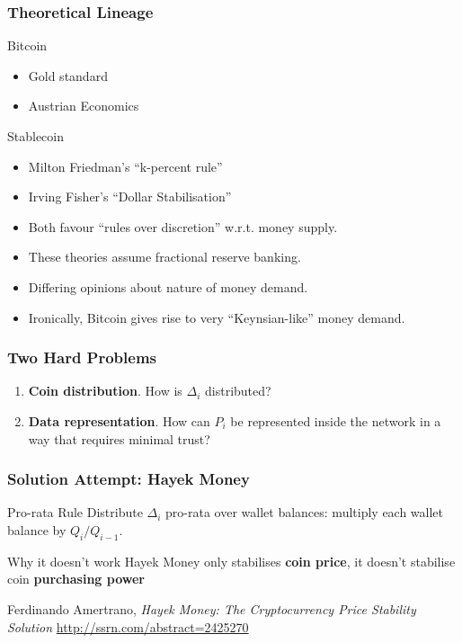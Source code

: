 \documentclass{beamer}
\begin{document}
\begin{frame}
  \frametitle{Theoretical Lineage}

  \begin{block}{Bitcoin}
    \begin{itemize}
    \item Gold standard
    \item Austrian Economics  
    \end{itemize}
  \end{block}

  \begin{block}{Stablecoin}
    \begin{itemize}
    \item Milton Friedman's ``k-percent rule''
    \item Irving Fisher's ``Dollar Stabilisation''
    \end{itemize}
  \end{block}

  \begin{itemize}
  \item Both favour ``rules over discretion'' w.r.t. money
    supply.
  \item These theories assume fractional reserve banking.
  \item Differing opinions about nature of money demand.
  \item Ironically, Bitcoin gives rise to very ``Keynsian-like'' money
    demand.
  \end{itemize}
  
\end{frame}

\begin{frame}
  \frametitle{Two Hard Problems}
  \begin{enumerate}
  \item \textbf{Coin distribution}. How is $\Delta_{i}$ distributed?
  \item \textbf{Data representation}. How can $P_{i}$ be represented
    inside the network in a way that requires minimal trust?
  \end{enumerate}
\end{frame}

\begin{frame}
  \frametitle{Solution Attempt: Hayek Money}
  
  \begin{block}{Pro-rata Rule}
    Distribute $\Delta_{i}$ pro-rata over wallet balances: multiply
    each wallet balance by $Q_{i}/Q_{i-1}$.
  \end{block}
  
  \begin{block}{Why it doesn't work}
    Hayek Money only stabilises \textbf{coin price}, it doesn't stabilise
    coin \textbf{purchasing power}
  \end{block}

  Ferdinando Amertrano, \emph{Hayek Money: The Cryptocurrency Price
    Stability Solution} 
  \url{http://ssrn.com/abstract=2425270}
\end{frame}
\end{document}
